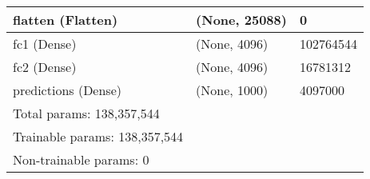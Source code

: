 \documentclass{article}
\begin{document}
\begin{center}
\begin{longtable}[h]{ p{}  p{}  p{}}
flatten (Flatten)             & (None, 25088)         & 0         \\ \hline
fc1 (Dense)                   & (None, 4096)          & 102764544 \\ \hline
fc2 (Dense)                   & (None, 4096)          & 16781312  \\ \hline
predictions (Dense)           & (None, 1000)          & 4097000   \\ \hline
Total params: 138,357,544     &                       &           \\
Trainable params: 138,357,544 &                       &           \\
Non-trainable params: 0       &                       &          
\label{tab:vgg16model}
\end{longtable}
\end{center}
\end{document}
